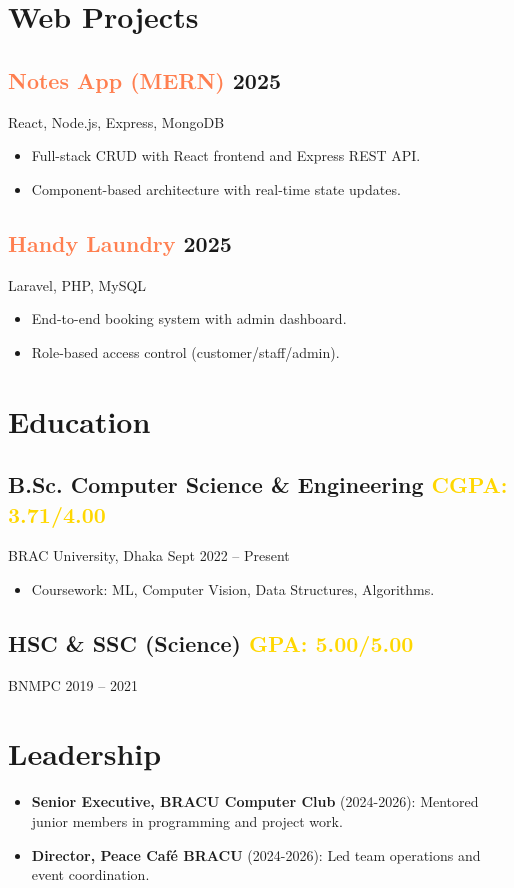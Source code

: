 \documentclass[11pt,a4paper]{article}
\begin{document}
\section{Web Projects}

\subsection*{\textcolor{coral}{Notes App (MERN)} \hfill \textcolor{muted}{2025}}
React, Node.js, Express, MongoDB
\begin{itemize}[leftmargin=*, label=\textcolor{coral}{\textendash}]
    \item Full-stack CRUD with React frontend and Express REST API.
    \item Component-based architecture with real-time state updates.
\end{itemize}

\subsection*{\textcolor{coral}{Handy Laundry} \hfill \textcolor{muted}{2025}}
Laravel, PHP, MySQL
\begin{itemize}[leftmargin=*, label=\textcolor{coral}{\textendash}]
    \item End-to-end booking system with admin dashboard.
    \item Role-based access control (customer/staff/admin).
\end{itemize}

\section{Education}

\subsection*{B.Sc. Computer Science \& Engineering \hfill \textcolor{gold}{CGPA: 3.71/4.00}}
BRAC University, Dhaka \hfill Sept 2022 -- Present
\begin{itemize}[leftmargin=*, label=\textcolor{coral}{\textendash}]
    \item Coursework: ML, Computer Vision, Data Structures, Algorithms.
\end{itemize}

\subsection*{HSC \& SSC (Science) \hfill \textcolor{gold}{GPA: 5.00/5.00}}
BNMPC \hfill 2019 -- 2021

\section{Leadership}
\begin{itemize}[leftmargin=*, label=\textcolor{coral}{\textendash}]
    \item \textbf{Senior Executive, BRACU Computer Club} (2024-2026): Mentored junior members in programming and project work.
    \item \textbf{Director, Peace Café BRACU} (2024-2026): Led team operations and event coordination.
\end{itemize}
\end{document}
